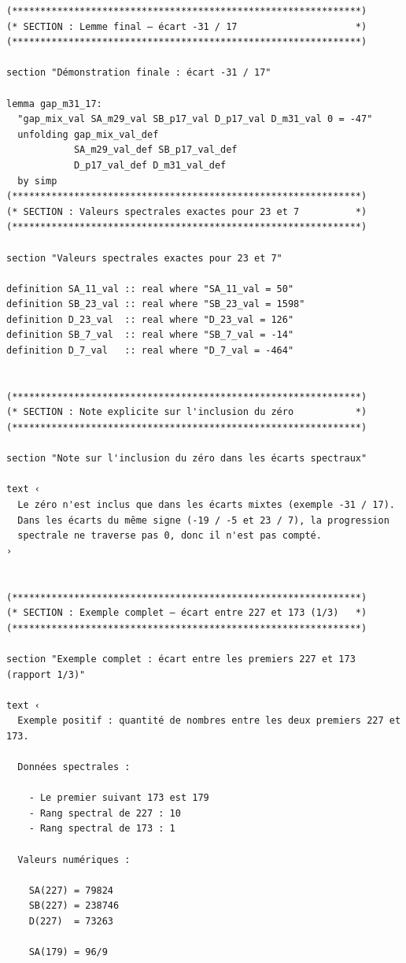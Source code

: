 \documentclass[a4paper,11pt]{article}
\begin{document}
\begin{holcode}[title={\textcolor{white}{Fichier : methode\_spectral.thy -- Partie 1/4}}]
\begin{lstlisting}
(**************************************************************)
(* SECTION : Lemme final – écart -31 / 17                     *)
(**************************************************************)

section "Démonstration finale : écart -31 / 17"

lemma gap_m31_17:
  "gap_mix_val SA_m29_val SB_p17_val D_p17_val D_m31_val 0 = -47"
  unfolding gap_mix_val_def
            SA_m29_val_def SB_p17_val_def
            D_p17_val_def D_m31_val_def
  by simp
(**************************************************************)
(* SECTION : Valeurs spectrales exactes pour 23 et 7          *)
(**************************************************************)

section "Valeurs spectrales exactes pour 23 et 7"

definition SA_11_val :: real where "SA_11_val = 50"
definition SB_23_val :: real where "SB_23_val = 1598"
definition D_23_val  :: real where "D_23_val = 126"
definition SB_7_val  :: real where "SB_7_val = -14"
definition D_7_val   :: real where "D_7_val = -464"


(**************************************************************)
(* SECTION : Note explicite sur l'inclusion du zéro           *)
(**************************************************************)

section "Note sur l'inclusion du zéro dans les écarts spectraux"

text ‹
  Le zéro n'est inclus que dans les écarts mixtes (exemple -31 / 17).
  Dans les écarts du même signe (-19 / -5 et 23 / 7), la progression
  spectrale ne traverse pas 0, donc il n'est pas compté.
›


(**************************************************************)
(* SECTION : Exemple complet – écart entre 227 et 173 (1/3)   *)
(**************************************************************)

section "Exemple complet : écart entre les premiers 227 et 173 (rapport 1/3)"

text ‹
  Exemple positif : quantité de nombres entre les deux premiers 227 et 173.

  Données spectrales :

    - Le premier suivant 173 est 179
    - Rang spectral de 227 : 10
    - Rang spectral de 173 : 1

  Valeurs numériques :

    SA(227) = 79824
    SB(227) = 238746
    D(227)  = 73263

    SA(179) = 96/9


\end{lstlisting}
\end{holcode}
\end{document}

